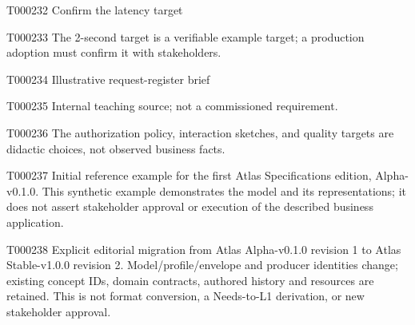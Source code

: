 \documentclass[11pt,a4paper]{article}
\begin{document}
\begin{atlastext}{T000232}
Confirm the latency target
\end{atlastext}
\begin{atlasparagraph}{T000233}
The 2-second target is a verifiable example target; a production adoption must confirm it with stakeholders.
\end{atlasparagraph}
\begin{atlastext}{T000234}
Illustrative request-register brief
\end{atlastext}
\begin{atlasparagraph}{T000235}
Internal teaching source; not a commissioned requirement.
\end{atlasparagraph}
\begin{atlasparagraph}{T000236}
The authorization policy, interaction sketches, and quality targets are didactic choices, not observed business facts.
\end{atlasparagraph}
\begin{atlasparagraph}{T000237}
Initial reference example for the first Atlas Specifications edition, Alpha-v0.1.0. This synthetic example demonstrates the model and its representations; it does not assert stakeholder approval or execution of the described business application.
\end{atlasparagraph}
\begin{atlasparagraph}{T000238}
Explicit editorial migration from Atlas Alpha-v0.1.0 revision 1 to Atlas Stable-v1.0.0 revision 2. Model/profile/envelope and producer identities change; existing concept IDs, domain contracts, authored history and resources are retained. This is not format conversion, a Needs-to-L1 derivation, or new stakeholder approval.
\end{atlasparagraph}
\end{document}
